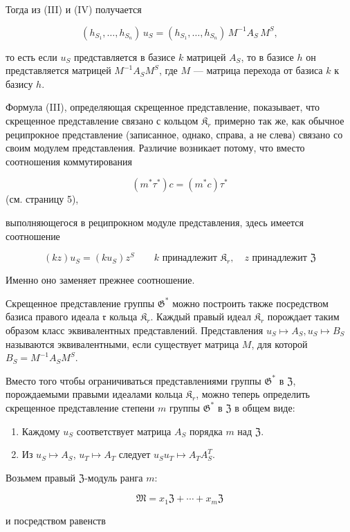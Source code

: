 \documentclass[11pt]{article}
\begin{document}
Тогда из (III) и (IV) получается

\[(h_{S_1},\ldots,h_{S_n})\,u_S=(h_{S_1},\ldots,h_{S_n})\,M^{-1}A_S\,M^S,\]

то есть если \(u_S\) представляется в базисе \(k\) матрицей \(A_S\), то в базисе \(h\) он представляется матрицей \(M^{-1}A_SM^S\), где \(M\) --- матрица перехода от базиса \(k\) к базису \(h\).

Формула (III), определяющая скрещенное представление, показывает, что скрещенное представление связано с кольцом \(\mathfrak K_r\) примерно так же, как обычное реципрокное представление (записанное, однако, справа, а не слева) связано со своим модулем представления. Различие возникает потому, что вместо соотношения коммутирования

\[(m^*\tau^*)c = (m^*c)\tau^*\]
(см. страницу 5),

выполняющегося в реципрокном модуле представления, здесь имеется соотношение

\[
(kz)u_S=(ku_S)z^S\qquad k\text{ принадлежит }\mathfrak K_r,\quad z\text{ принадлежит }\mathfrak Z
\]

Именно оно заменяет прежнее соотношение.

Скрещенное представление группы \(\mathfrak{G}^*\) можно построить также посредством базиса правого идеала \(\mathfrak r\) кольца \(\mathfrak{K}_r\). Каждый правый идеал \(\mathfrak{K}_r\) порождает таким образом класс эквивалентных представлений. Представления \(u_S \mapsto A_S, u_S \mapsto B_S\) называются эквивалентными, если существует матрица \(M\), для которой \(B_S = M^{-1}A_SM^S\).

Вместо того чтобы ограничиваться представлениями группы \(\mathfrak G^*\) в \(\mathfrak Z\), порождаемыми правыми идеалами кольца \(\mathfrak K_r\), можно теперь определить скрещенное представление степени \(m\) группы \(\mathfrak G^*\) в \(\mathfrak Z\) в общем виде:

\begin{enumerate}
\item Каждому \(u_S\) соответствует матрица \(A_S\) порядка \(m\) над \(\mathfrak Z\).
\item Из \(u_S \mapsto A_S\), \(u_T \mapsto A_T\) следует \(u_Su_T \mapsto A_TA_S^T\).
\end{enumerate}

Возьмем правый \(\mathfrak Z\)-модуль ранга \(m\):

\[\mathfrak{M}=x_1\mathfrak{Z}+\cdots+x_m\mathfrak{Z}\]

и посредством равенств
\end{document}
